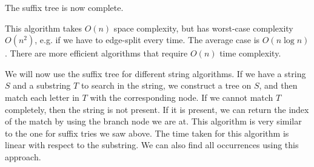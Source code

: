 \documentclass[a4paper, openany]{memoir}
\begin{document}
    \begin{figure}[H]
        \centering
    \end{figure}
    \noindent The suffix tree is now complete.

    This algorithm takes $O(n)$ space complexity, but has worst-case complexity $O(n^2)$, e.g. if we have to edge-split every time. The average case is $O(n \log n)$. There are more efficient algorithms that require $O(n)$ time complexity.

    We will now use the suffix tree for different string algorithms. If we have a string $S$ and a substring $T$ to search in the string, we construct a tree on $S$, and then match each letter in $T$ with the corresponding node. If we cannot match $T$ completely, then the string is not present. If it is present, we can return the index of the match by using the branch node we are at. This algorithm is very similar to the one for suffix tries we saw above. The time taken for this algorithm is linear with respect to the substring. We can also find all occurrences using this approach.
\end{document}
